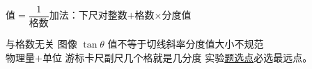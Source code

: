 值$=\dfrac{1}{\text{格数}}$\quad 加法：下尺对整数$+$格数$\times$分度值 %

与格数无关 %
图像 $\tan\theta$ 值不等于切线斜率\quad 分度值大小不规范 \\
物理量$+$单位
游标卡尺副尺几个格就是几分度 %
实验\underline{题选点}必选最远点。

